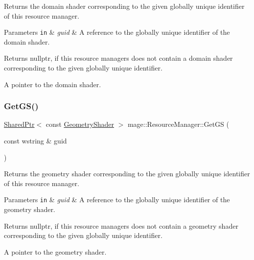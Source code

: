 Returns the domain shader corresponding to the given globally unique identifier of this resource manager.


\begin{DoxyParams}[1]{Parameters}
\mbox{\tt in}  & {\em guid} & A reference to the globally unique identifier of the domain shader. \\
\hline
\end{DoxyParams}
\begin{DoxyReturn}{Returns}
{\ttfamily nullptr}, if this resource managers does not contain a domain shader corresponding to the given globally unique identifier. 

A pointer to the domain shader. 
\end{DoxyReturn}
\hypertarget{classmage_1_1_resource_manager_a66d1b171420e1a3310c6db5db88e3029}{}\label{classmage_1_1_resource_manager_a66d1b171420e1a3310c6db5db88e3029} 
\subsubsection{\texorpdfstring{Get\+G\+S()}{GetGS()}}
{\footnotesize\ttfamily \hyperlink{namespacemage_a1e01ae66713838a7a67d30e44c67703e}{Shared\+Ptr}$<$ const \hyperlink{namespacemage_a0cf0bb4b74903e78658c96412d5687a6}{Geometry\+Shader} $>$ mage\+::\+Resource\+Manager\+::\+Get\+GS (\begin{DoxyParamCaption}\item[{const wstring \&}]{guid }\end{DoxyParamCaption})\hspace{0.3cm}{\ttfamily [noexcept]}}

Returns the geometry shader corresponding to the given globally unique identifier of this resource manager.


\begin{DoxyParams}[1]{Parameters}
\mbox{\tt in}  & {\em guid} & A reference to the globally unique identifier of the geometry shader. \\
\hline
\end{DoxyParams}
\begin{DoxyReturn}{Returns}
{\ttfamily nullptr}, if this resource managers does not contain a geometry shader corresponding to the given globally unique identifier. 

A pointer to the geometry shader. 
\end{DoxyReturn}
\hypertarget{classmage_1_1_resource_manager_a6b36abca958e92f7a3787598d9c13352}{}\label{classmage_1_1_resource_manager_a6b36abca958e92f7a3787598d9c13352} 

